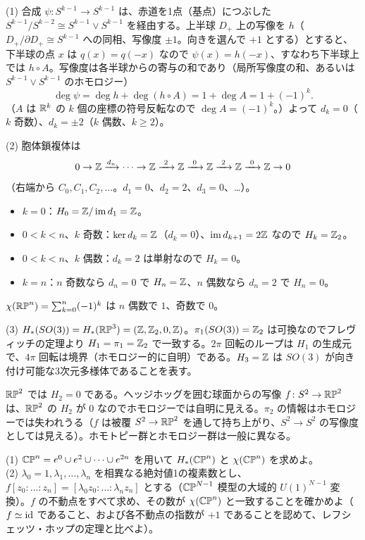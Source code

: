 \begin{solution}
(1) 合成 $\psi\colon S^{k-1}\to S^{k-1}$ は、赤道を1点（基点）につぶした $S^{k-1}/S^{k-2}\cong S^{k-1}\vee S^{k-1}$ を経由する。上半球 $D_+$ 上の写像を $h$（$D_+/\partial D_+\cong S^{k-1}$ への同相、写像度 $\pm1$。向きを選んで $+1$ とする）とすると、下半球の点 $x$ は $q(x)=q(-x)$ なので $\psi(x)=h(-x)$、すなわち下半球上では $h\circ A$。写像度は各半球からの寄与の和であり（局所写像度の和、あるいは $S^{k-1}\vee S^{k-1}$ のホモロジー）
\[
\deg\psi=\deg h+\deg(h\circ A)=1+\deg A=1+(-1)^k .
\]
（$A$ は $\mathbb{R}^k$ の $k$ 個の座標の符号反転なので $\deg A=(-1)^k$。）よって $d_k=0$（$k$ 奇数）、$d_k=\pm2$（$k$ 偶数、$k\ge2$）。

(2) 胞体鎖複体は
\[
0\to\Z\xrightarrow{d_n}\cdots\to\Z\xrightarrow{\ 2\ }\Z\xrightarrow{\ 0\ }\Z\xrightarrow{\ 2\ }\Z\xrightarrow{\ 0\ }\Z\to0
\]
（右端から $C_0,C_1,C_2,\dots$。$d_1=0$、$d_2=2$、$d_3=0$、…）。
\begin{itemize}
\item $k=0$：$H_0=\mathbb{Z}/\operatorname{im}d_1=\mathbb{Z}$。
\item $0<k<n$、$k$ 奇数：$\ker d_k=\mathbb{Z}$（$d_k=0$）、$\operatorname{im}d_{k+1}=2\mathbb{Z}$ なので $H_k=\mathbb{Z}_2$。
\item $0<k<n$、$k$ 偶数：$d_k=2$ は単射なので $H_k=0$。
\item $k=n$：$n$ 奇数なら $d_n=0$ で $H_n=\mathbb{Z}$、$n$ 偶数なら $d_n=2$ で $H_n=0$。
\end{itemize}
$\chi(\mathbb{RP}^n)=\sum_{k=0}^n(-1)^k$ は $n$ 偶数で $1$、奇数で $0$。

(3) $H_*(SO(3))=H_*(\mathbb{RP}^3)=(\mathbb{Z},\mathbb{Z}_2,0,\mathbb{Z})$。$\pi_1(SO(3))=\mathbb{Z}_2$ は可換なのでフレヴィッチの定理より $H_1=\pi_1=\mathbb{Z}_2$ で一致する。$2\pi$ 回転のループは $H_1$ の生成元で、$4\pi$ 回転は境界（ホモロジー的に自明）である。$H_3=\mathbb{Z}$ は $SO(3)$ が向き付け可能な3次元多様体であることを表す。

$\mathbb{RP}^2$ では $H_2=0$ である。ヘッジホッグを囲む球面からの写像 $f\colon S^2\to\mathbb{RP}^2$ は、$\mathbb{RP}^2$ の $H_2$ が $0$ なのでホモロジーでは自明に見える。$\pi_2$ の情報はホモロジーでは失われうる（$f$ は被覆 $S^2\to\mathbb{RP}^2$ を通して持ち上がり、$S^2\to S^2$ の写像度としては見える）。ホモトピー群とホモロジー群は一般に異なる。
\end{solution}

\begin{problem}[難易度 A]\label{ch04-prob-cpn}
(1) $\mathbb{CP}^n=e^0\cup e^2\cup\dots\cup e^{2n}$ を用いて $H_*(\mathbb{CP}^n)$ と $\chi(\mathbb{CP}^n)$ を求めよ。\\
(2) $\lambda_0=1,\lambda_1,\dots,\lambda_n$ を相異なる絶対値1の複素数とし、$f[z_0:\dots:z_n]=[\lambda_0z_0:\dots:\lambda_nz_n]$ とする（$\mathbb{CP}^{N-1}$ 模型の大域的 $U(1)^{N-1}$ 変換）。$f$ の不動点をすべて求め、その数が $\chi(\mathbb{CP}^n)$ と一致することを確かめよ（$f\simeq\mathrm{id}$ であること、および各不動点の指数が $+1$ であることを認めて、レフシェッツ・ホップの定理と比べよ）。
\end{problem}

